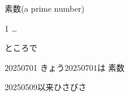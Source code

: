 \documentclass[aspectratio=169,xcolor={dvipsnames,table}]{beamer}
\begin{document}
\begin{frame}[plain]{素数(a prime number)}
\Large

\pause

1\hspace{10pt}\pause
{}\hspace{10pt}\pause
{}\hspace{10pt}\hspace{10pt}\pause
{}\hspace{10pt}\hspace{10pt}\pause
{}\hspace{10pt}\hspace{10pt}\hspace{10pt}\hspace{10pt}\pause
{}\hspace{10pt}\hspace{10pt}\pause
{}\hspace{10pt}\hspace{10pt}\hspace{10pt}\hspace{10pt}\pause
{} \ldots\hspace{10pt}\pause

\bigskip

ところで\\


\end{frame}
\normalsize
\begin{frame}[plain]{20250701}
 \Large
\centering
\pause
\vfill
きょう$20250701$は\pause
素数\pause

\vfill

\hfill{20250509以来ひさびさ}



\end{frame}
\end{document}
